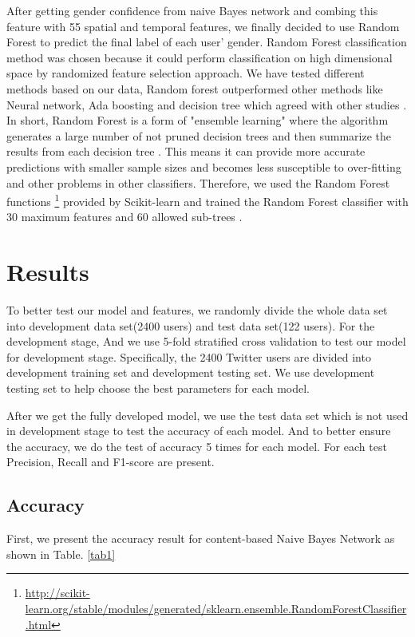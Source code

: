 \documentclass{article}
\begin{document}
After getting gender confidence from naive Bayes network and combing this feature with 55 spatial and temporal features, we finally decided to use Random Forest to predict the final label of each user'  gender. Random Forest classification method was chosen because it could perform classification on high dimensional space by randomized feature selection approach\cite{breiman2001random}.  We have tested different methods based on our data, Random forest outperformed other methods like Neural network, Ada boosting and decision tree which agreed with other studies \cite{liaw2002classification}. In short, Random Forest is a form of "ensemble learning" where the algorithm generates a large number of not pruned decision trees and then summarize the results from each decision tree \cite{breiman2001random}. This means it can provide more accurate predictions with smaller sample sizes and becomes less susceptible to over-fitting and other problems in other classifiers. Therefore, we used the Random Forest functions \footnote{\url{http://scikit-learn.org/stable/modules/generated/sklearn.ensemble.RandomForestClassifier.html}} provided by Scikit-learn and trained the Random Forest classifier with 30 maximum features and 60 allowed sub-trees \cite{scikit-learn}.

\section{Results}
To better test our model and features, we randomly divide the whole data set into development data set(2400 users) and test data set(122 users). For the development stage, And we use 5-fold stratified cross validation to test our model for development stage. Specifically, the 2400 Twitter users are divided into development training set and development testing set. We use development testing set to help choose the best parameters for each model.

After we get the fully developed model, we use the test data set which is not used in development stage to test the accuracy of each model. And to better ensure the accuracy, we do the test of accuracy 5 times for each model. For each test Precision, Recall and F1-score are present.

\subsection{Accuracy} 

First, we present the accuracy result for content-based Naive Bayes Network as shown in Table. \ref{tab1} 
\end{document}
